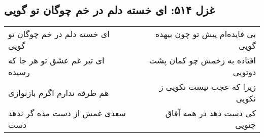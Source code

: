 \begin{center}
\section*{غزل ۵۱۴: ای خسته دلم در خم چوگان تو گویی}
\label{sec:514}
\begin{longtable}{l p{0.5cm} r}
ای خسته دلم در خم چوگان تو گویی
&&
بی فایده‌ام پیش تو چون بیهده گویی
\\
ای تیر غم عشق تو هر جا که رسیده
&&
افتاده به زخمش چو کمان پشت دوتویی
\\
هم طرفه ندارم اگرم بازنوازی
&&
زیرا که عجب نیست نکویی ز نکویی
\\
سعدی غمش از دست مده گر ندهد دست
&&
کی دست دهد در همه آفاق چنویی
\\
\end{longtable}
\end{center}
